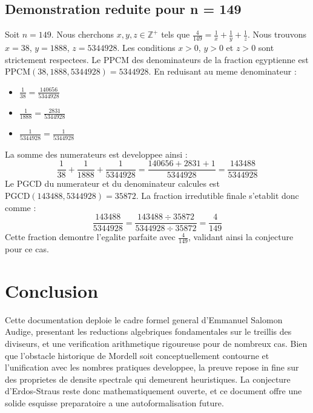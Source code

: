 \documentclass[11pt,a4paper]{article}
\begin{document}
\subsection{Demonstration reduite pour n = 149}
Soit $n = 149$. Nous cherchons $x, y, z \in \mathbb{Z}^{+}$ tels que $\frac{4}{149} = \frac{1}{x} + \frac{1}{y} + \frac{1}{z}$.
Nous trouvons $x = 38$, $y = 1888$, $z = 5344928$.
Les conditions $x > 0$, $y > 0$ et $z > 0$ sont strictement respectees.
Le PPCM des denominateurs de la fraction egyptienne est $\text{PPCM}(38, 1888, 5344928) = 5344928$.
En reduisant au meme denominateur :
\begin{itemize}
    \item $\frac{1}{38} = \frac{140656}{5344928}$
    \item $\frac{1}{1888} = \frac{2831}{5344928}$
    \item $\frac{1}{5344928} = \frac{1}{5344928}$
\end{itemize}
La somme des numerateurs est developpee ainsi :
$$ \frac{1}{38} + \frac{1}{1888} + \frac{1}{5344928} = \frac{140656 + 2831 + 1}{5344928} = \frac{143488}{5344928} $$
Le PGCD du numerateur et du denominateur calcules est $\text{PGCD}(143488, 5344928) = 35872$.
La fraction irredutible finale s'etablit donc comme :
$$ \frac{143488}{5344928} = \frac{143488 \div 35872}{5344928 \div 35872} = \frac{4}{149} $$
Cette fraction demontre l'egalite parfaite avec $\frac{4}{149}$, validant ainsi la conjecture pour ce cas.

\section{Conclusion}

Cette documentation deploie le cadre formel general d'Emmanuel Salomon Audige, presentant les reductions algebriques fondamentales sur le treillis des diviseurs, et une verification arithmetique rigoureuse pour de nombreux cas. Bien que l'obstacle historique de Mordell soit conceptuellement contourne et l'unification avec les nombres pratiques developpee, la preuve repose in fine sur des proprietes de densite spectrale qui demeurent heuristiques. La conjecture d'Erdos-Straus reste donc mathematiquement ouverte, et ce document offre une solide esquisse preparatoire a une autoformalisation future.
\end{document}
